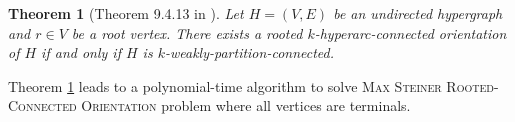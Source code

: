 \documentclass{article}
\newtheorem{theorem}{Theorem}[section]
\begin{document}
\begin{theorem}[Theorem 9.4.13 in \cite{Frank-book}]\label{thm:frank:weak-pc-iff-rooted-hyparc-conn-orientation}
    Let $H = (V, E)$ be an undirected hypergraph and $r \in V$ be a root vertex. There exists a rooted $k$-hyperarc-connected orientation of $H$ if and only if $H$ is $k$-weakly-partition-connected.
\end{theorem}
Theorem \ref{thm:frank:weak-pc-iff-rooted-hyparc-conn-orientation} leads to a polynomial-time algorithm to solve \textsc{Max Steiner Rooted-Connected Orientation} problem where all vertices are terminals. 
\end{document}
